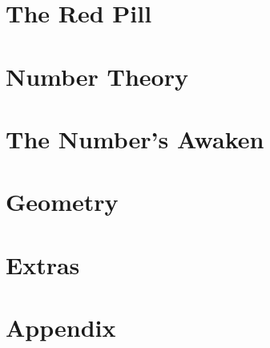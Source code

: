 \documentclass{maaprb}
\begin{document}
\part{The Red Pill}








\part{Number Theory}





\part{The Number's Awaken}



\part{Geometry}


\part{Extras}


\backmatter

\appendix
\part{Appendix}





\clearpage
\end{document}
